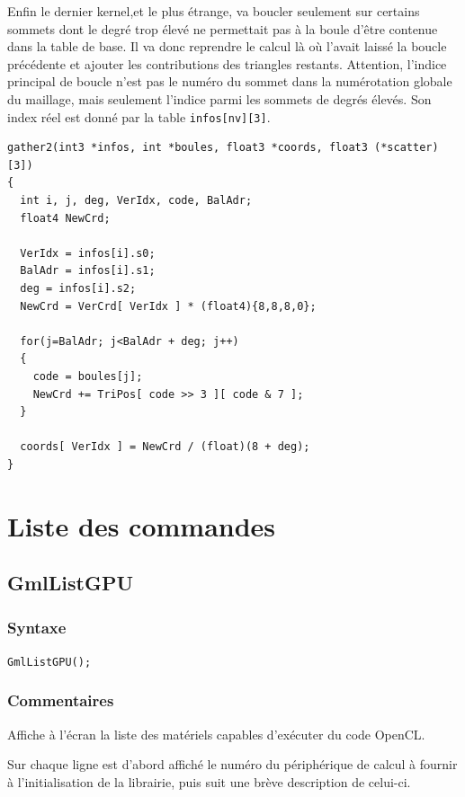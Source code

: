 \documentclass[a4paper,12pt]{article}
\begin{document}
Enfin le dernier kernel,et le plus étrange, va boucler seulement sur certains sommets dont le degré trop élevé ne permettait pas à la boule d'être contenue dans la table de base. Il va donc reprendre le calcul là où l'avait laissé la boucle précédente et ajouter les contributions des triangles restants. Attention, l'indice principal de boucle n'est pas le numéro du sommet dans la numérotation globale du maillage, mais seulement l'indice parmi les sommets de degrés élevés. Son index réel est donné par la table  {\tt infos[nv][3]}.

\begin{tt}
\begin{verbatim}
gather2(int3 *infos, int *boules, float3 *coords, float3 (*scatter)[3])
{
  int i, j, deg, VerIdx, code, BalAdr;
  float4 NewCrd;

  VerIdx = infos[i].s0;
  BalAdr = infos[i].s1;
  deg = infos[i].s2;
  NewCrd = VerCrd[ VerIdx ] * (float4){8,8,8,0};

  for(j=BalAdr; j<BalAdr + deg; j++)
  {
    code = boules[j];
    NewCrd += TriPos[ code >> 3 ][ code & 7 ];
  }

  coords[ VerIdx ] = NewCrd / (float)(8 + deg);
}
\end{verbatim}
\end{tt}
\normalfont



%
%

\section{Liste des commandes}


\subsection{GmlListGPU}
\subsubsection*{Syntaxe}

{\tt GmlListGPU();}
\subsubsection*{Commentaires}

Affiche à l'écran la liste des matériels capables d'exécuter du code OpenCL.

Sur chaque ligne est d'abord affiché le numéro du périphérique de calcul à fournir à l'initialisation de la librairie, puis suit une brève description de celui-ci.
\end{document}
